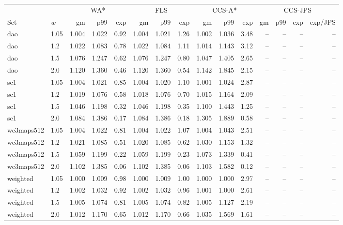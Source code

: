 \begin{tabular}{ll rrr rrr rrr rrrr}\toprule
 & & \multicolumn{3}{c}{WA*} & \multicolumn{3}{c}{FLS} & \multicolumn{3}{c}{CCS-A*} & \multicolumn{4}{c}{CCS-JPS}\\
Set & $w$ & gm & p99 & exp & gm & p99 & exp & gm & p99 & exp & gm & p99 & exp & exp/JPS\\\midrule
dao & 1.05 & 1.004 & 1.022 & 0.92 & 1.004 & 1.021 & 1.26 & 1.002 & 1.036 & 3.48 & -- & -- & -- & --\\
dao & 1.2 & 1.022 & 1.083 & 0.78 & 1.022 & 1.084 & 1.11 & 1.014 & 1.143 & 3.12 & -- & -- & -- & --\\
dao & 1.5 & 1.076 & 1.247 & 0.62 & 1.076 & 1.247 & 0.80 & 1.047 & 1.405 & 2.65 & -- & -- & -- & --\\
dao & 2.0 & 1.120 & 1.360 & 0.46 & 1.120 & 1.360 & 0.54 & 1.142 & 1.845 & 2.15 & -- & -- & -- & --\\
sc1 & 1.05 & 1.004 & 1.021 & 0.85 & 1.004 & 1.020 & 1.10 & 1.001 & 1.024 & 2.87 & -- & -- & -- & --\\
sc1 & 1.2 & 1.019 & 1.076 & 0.58 & 1.018 & 1.076 & 0.70 & 1.015 & 1.164 & 2.09 & -- & -- & -- & --\\
sc1 & 1.5 & 1.046 & 1.198 & 0.32 & 1.046 & 1.198 & 0.35 & 1.100 & 1.443 & 1.25 & -- & -- & -- & --\\
sc1 & 2.0 & 1.084 & 1.386 & 0.17 & 1.084 & 1.386 & 0.18 & 1.305 & 1.889 & 0.58 & -- & -- & -- & --\\
wc3maps512 & 1.05 & 1.004 & 1.022 & 0.81 & 1.004 & 1.022 & 1.07 & 1.004 & 1.043 & 2.51 & -- & -- & -- & --\\
wc3maps512 & 1.2 & 1.021 & 1.085 & 0.51 & 1.020 & 1.085 & 0.62 & 1.030 & 1.153 & 1.32 & -- & -- & -- & --\\
wc3maps512 & 1.5 & 1.059 & 1.199 & 0.22 & 1.059 & 1.199 & 0.23 & 1.073 & 1.339 & 0.41 & -- & -- & -- & --\\
wc3maps512 & 2.0 & 1.102 & 1.385 & 0.06 & 1.102 & 1.385 & 0.06 & 1.103 & 1.582 & 0.12 & -- & -- & -- & --\\
weighted & 1.05 & 1.000 & 1.009 & 0.98 & 1.000 & 1.009 & 1.00 & 1.000 & 1.000 & 2.97 & -- & -- & -- & --\\
weighted & 1.2 & 1.002 & 1.032 & 0.92 & 1.002 & 1.032 & 0.96 & 1.001 & 1.000 & 2.61 & -- & -- & -- & --\\
weighted & 1.5 & 1.005 & 1.074 & 0.81 & 1.005 & 1.074 & 0.82 & 1.005 & 1.127 & 2.19 & -- & -- & -- & --\\
weighted & 2.0 & 1.012 & 1.170 & 0.65 & 1.012 & 1.170 & 0.66 & 1.035 & 1.569 & 1.61 & -- & -- & -- & --\\
\bottomrule\end{tabular}
